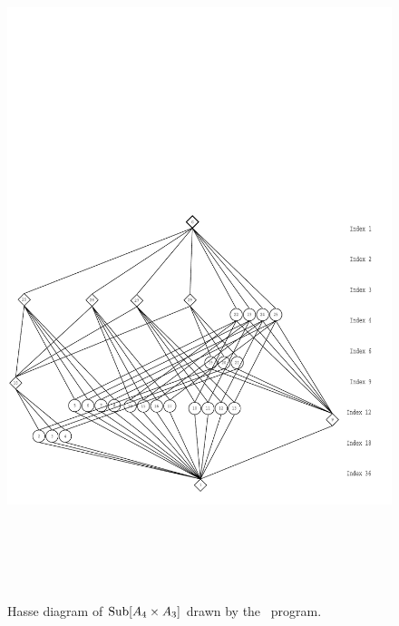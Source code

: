 \begin{enumerate}
{\begin{verbatim}
\end{verbatim}}
\begin{figure}[h!]\begin{center}
\vspace{-8cm}
\includegraphics[height=20cm]{a4a3new.pdf}%
\caption{Hasse diagram of $\operatorname{Sub}[A_4 \times A_3]$ drawn by the \xgap\ program.}
\label{fig:a4a3}
\end{center}\end{figure}
\begin{figure}[h!]\begin{center}
\vspace{-8cm}

\end{center}
\end{figure}
\end{enumerate}
